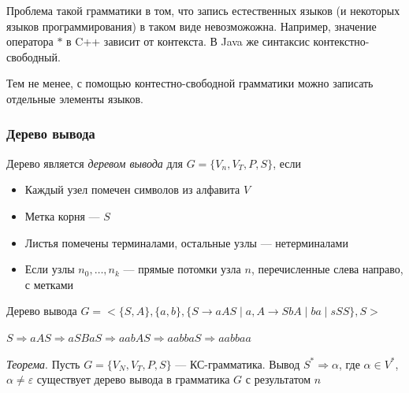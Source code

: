 \documentclass[a4paper, 14pt]{extarticle}
\begin{document}
Проблема такой грамматики в том, что запись естественных языков (и некоторых языков программирования) в таком виде невозможожна. Например, значение оператора $*$ в C++ зависит от контекста. В Java же синтаксис контекстно-свободный.

Тем не менее, с помощью контестно-свободной грамматики можно записать отдельные элементы языков. 

\subsubsection*{Дерево вывода}
Дерево является \textit{деревом вывода} для $G = \{ V_n, V_T, P, S \} $, если
\begin{itemize}
    \item Каждый узел помечен символов из алфавита $V$
    \item Метка корня --- $S$
    \item Листья помечены терминалами, остальные узлы --- нетерминалами
    \item Если узлы $n_0, \ldots, n_k$ --- прямые потомки узла $n$, перечисленные слева направо, с метками
\end{itemize}

\begin{example}{Дерево вывода}
    $ G = < \{ S, A \}, \{ a, b \}, \{ S \rightarrow aAS \mid a, A \rightarrow SbA \mid ba \mid sSS \}, S > $

    $ S \Rightarrow aAS \Rightarrow aSBaS \Rightarrow aabAS \Rightarrow aabbaS \Rightarrow aabbaa $

\end{example}

\begin{tcolorbox}
\textit{Теорема}. Пусть $G = \{V_N, V_T, P, S\}$ --- КС-грамматика. Вывод $S^* \Rightarrow \alpha$, где $\alpha \in V^*$, $\alpha \ne \varepsilon$ существует дерево вывода в грамматика $G$ с результатом $n$
\end{tcolorbox}
\end{document}
